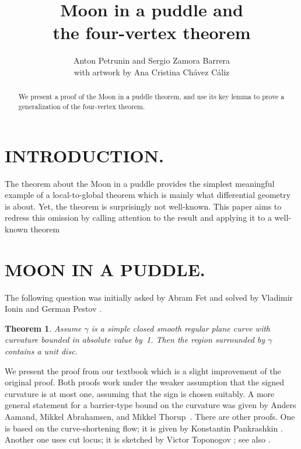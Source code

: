 \documentclass{article}
\theoremstyle{theorem}
\newtheorem{theorem}{Theorem}
\theoremstyle{definition}
\begin{document}
\final
\title{Moon in a puddle and\\ the four-vertex theorem}
\author{Anton Petrunin and Sergio Zamora Barrera\\ with artwork by Ana Cristina Chávez Cáliz}

\maketitle
\BgThispage
\thispagestyle{empty}
\begin{abstract}
We present a proof of the Moon in a puddle theorem, and use its key lemma to prove a generalization of the four-vertex theorem.
\end{abstract}

\newpage

\section*{INTRODUCTION.}

The theorem about the Moon in a puddle provides the simplest meaningful example of a local-to-global theorem which is mainly what differential geometry is about.
Yet, the theorem is surprisingly not well-known.
This paper aims to redress this omission by calling attention to the result and applying it to a well-known theorem

\section*{MOON IN A PUDDLE.}
The following question was initially asked by Abram Fet and solved by Vladimir Ionin and German Pestov \cite{pestov-ionin}.

\begin{theorem}\label{thm:moon-orginal}
Assume $\gamma$ is a simple closed smooth regular plane curve with curvature bounded in absolute value by~1.
Then the region surrounded by $\gamma$ contains a unit disc.
\end{theorem}

We present the proof from our textbook \cite{petrunin-zamora} which is 
a slight improvement of the original proof.
Both proofs work under the weaker assumption that the signed curvature is at most one, assuming that the sign is chosen suitably.
A more general statement for a barrier-type bound on the curvature was given by Anders Aamand, Mikkel Abrahamsen, and Mikkel Thorup~\cite{aamand-abrahamsen-thoru}.
There are other proofs. 
One is based on the curve-shortening flow; it is given by Konstantin Pankrashkin  \cite{pankrashkin}.
Another one uses cut locus; it is sketched by Victor Toponogov 
\cite[Problem 1.7.19]{toponogov}; see also \cite{petrunin-2020}.
\end{document}
